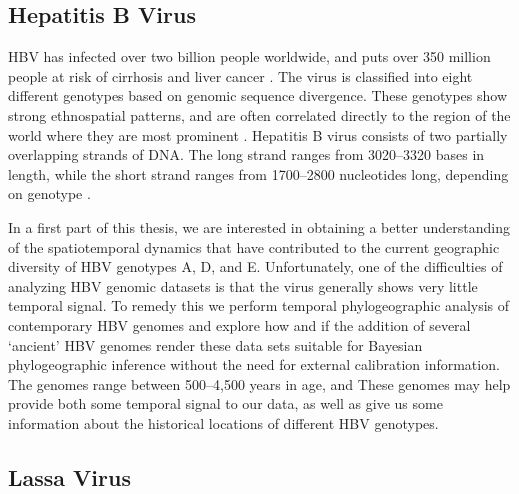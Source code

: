 \subsection{Hepatitis B Virus}

HBV has infected over two billion people worldwide, and puts over 350 million people at risk of cirrhosis and liver cancer \cite{kane1995}.
The virus is classified into eight different genotypes based on genomic sequence divergence.
These genotypes show strong ethnospatial patterns, and are often correlated directly to the region of the world where they are most prominent \cite{schaefer2007}.
Hepatitis B virus consists of two partially overlapping strands of DNA. %
The long strand ranges from 3020--3320 bases in length, while the short strand ranges from 1700--2800 nucleotides long, depending on genotype \cite{kay2007_hepatitis_b_virus_genetic_variability}.

In a first part of this thesis, we are interested in obtaining a better understanding of the spatiotemporal dynamics that have contributed to the current geographic diversity of HBV genotypes A, D, and E.
Unfortunately, one of the difficulties of analyzing HBV genomic datasets is that the virus generally shows very little temporal signal. %
To remedy this we perform temporal phylogeographic analysis of contemporary HBV genomes and explore how and if the addition of several `ancient' HBV genomes render these data sets suitable for Bayesian phylogeographic inference without the need for external calibration information. %
The genomes range between 500--4,500 years in age, and %
These genomes may help provide both some temporal signal to our data, as well as give us some information about the historical locations of different HBV genotypes.



\subsection{Lassa Virus} %

